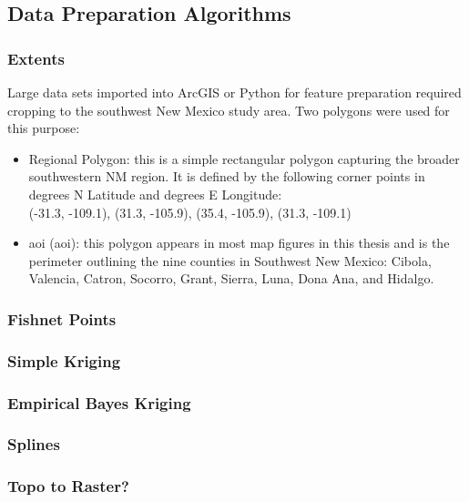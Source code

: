 \subsection{Data Preparation Algorithms}

\subsubsection{Extents}

Large data sets imported into ArcGIS or Python for feature preparation required cropping to the southwest New Mexico study area. Two polygons were used for this purpose:

\begin{itemize}
\item Regional Polygon: this is a simple rectangular polygon capturing the broader southwestern NM region. It is defined by the following corner points in degrees N Latitude and degrees E Longitude: \\ (-31.3, -109.1), (31.3, -105.9), (35.4, -105.9), (31.3, -109.1)
\item \acrlong{aoi} (\acrshort{aoi}): this polygon appears in most map figures in this thesis and is the perimeter outlining the nine counties in Southwest New Mexico: Cibola, Valencia, Catron, Socorro, Grant, Sierra, Luna, Dona Ana, and Hidalgo.
\end{itemize}

\subsubsection{Fishnet Points}\label{ssn:fishnet}

\subsubsection{Simple Kriging}\label{ssn:kriging}

\subsubsection{Empirical Bayes Kriging}\label{ssn:ebk}

\subsubsection{Splines}

\subsubsection{Topo to Raster?}

